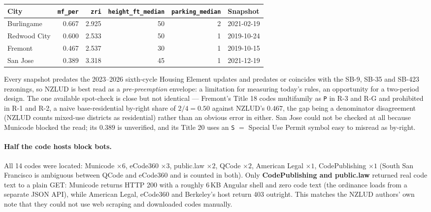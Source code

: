 \documentclass[11pt]{article}
\begin{document}
\begin{center}
\begin{tabular}{lrrrrl}
\toprule
\textbf{City} & \texttt{mf\_per} & \texttt{zri} & \texttt{height\_ft\_median} &
\texttt{parking\_median} & \textbf{Snapshot} \\
\midrule
Burlingame   & 0.667 & 2.925 & 50 & 2 & 2021-02-19 \\
Redwood City & 0.600 & 2.533 & 50 & 1 & 2019-10-24 \\
Fremont      & 0.467 & 2.537 & 30 & 1 & 2019-10-15 \\
San Jose     & 0.389 & 3.318 & 45 & 1 & 2021-12-19 \\
\bottomrule
\end{tabular}
\end{center}

Every snapshot predates the 2023--2026 sixth-cycle Housing Element updates and predates or
coincides with the SB-9, SB-35 and SB-423 rezonings, so NZLUD is best read as a
\emph{pre-preemption} envelope: a limitation for measuring today's rules, an opportunity for a
two-period design. The one available spot-check is close but not identical --- Fremont's Title 18
codes multifamily as \texttt{P} in R-3 and R-G and prohibited in R-1 and R-2, a naive
base-residential by-right share of $2/4 = 0.50$ against NZLUD's $0.467$, the gap being a
denominator disagreement (NZLUD counts mixed-use districts as residential) rather than an obvious
error in either. San Jose could not be checked at all because Municode blocked the read; its
$0.389$ is unverified, and its Title 20 uses an \texttt{S} $=$ Special Use Permit symbol easy to
misread as by-right.

\paragraph{Half the code hosts block bots.} All 14 codes were located: Municode $\times 6$,
eCode360 $\times 3$, public.law $\times 2$, QCode $\times 2$, American Legal $\times 1$,
CodePublishing $\times 1$ (South San Francisco is ambiguous between QCode and eCode360 and is
counted in both). Only \textbf{CodePublishing and public.law} returned real code text to a plain
GET: Municode returns HTTP 200 with a roughly 6\,KB Angular shell and zero code text (the
ordinance loads from a separate JSON API), while American Legal, eCode360 and Berkeley's host
return 403 outright. This matches the NZLUD authors' own note that they could not use web
scraping and downloaded codes manually.
\end{document}
